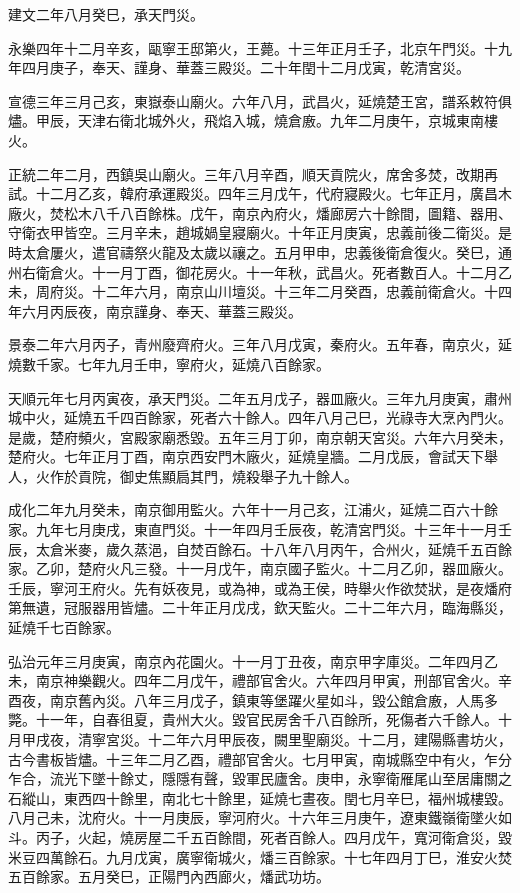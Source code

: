 \begin{pinyinscope}
建文二年八月癸巳，承天門災。

永樂四年十二月辛亥，甌寧王邸第火，王薨。十三年正月壬子，北京午門災。十九年四月庚子，奉天、謹身、華蓋三殿災。二十年閏十二月戊寅，乾清宮災。

宣德三年三月己亥，東嶽泰山廟火。六年八月，武昌火，延燒楚王宮，譜系敕符俱燼。甲辰，天津右衛北城外火，飛焰入城，燒倉廒。九年二月庚午，京城東南樓火。

正統二年二月，西鎮吳山廟火。三年八月辛酉，順天貢院火，席舍多焚，改期再試。十二月乙亥，韓府承運殿災。四年三月戊午，代府寢殿火。七年正月，廣昌木廠火，焚松木八千八百餘株。戊午，南京內府火，燔廊房六十餘間，圖籍、器用、守衛衣甲皆空。三月辛未，趙城媧皇寢廟火。十年正月庚寅，忠義前後二衛災。是時太倉屢火，遣官禱祭火龍及太歲以禳之。五月甲申，忠義後衛倉復火。癸巳，通州右衛倉火。十一月丁酉，御花房火。十一年秋，武昌火。死者數百人。十二月乙未，周府災。十二年六月，南京山川壇災。十三年二月癸酉，忠義前衛倉火。十四年六月丙辰夜，南京謹身、奉天、華蓋三殿災。

景泰二年六月丙子，青州廢齊府火。三年八月戊寅，秦府火。五年春，南京火，延燒數千家。七年九月壬申，寧府火，延燒八百餘家。

天順元年七月丙寅夜，承天門災。二年五月戊子，器皿廠火。三年九月庚寅，肅州城中火，延燒五千四百餘家，死者六十餘人。四年八月己巳，光祿寺大烹內門火。是歲，楚府頻火，宮殿家廟悉毀。五年三月丁卯，南京朝天宮災。六年六月癸未，楚府火。七年正月丁酉，南京西安門木廠火，延燒皇牆。二月戊辰，會試天下舉人，火作於貢院，御史焦顯扃其門，燒殺舉子九十餘人。

成化二年九月癸未，南京御用監火。六年十一月己亥，江浦火，延燒二百六十餘家。九年七月庚戌，東直門災。十一年四月壬辰夜，乾清宮門災。十三年十一月壬辰，太倉米麥，歲久蒸浥，自焚百餘石。十八年八月丙午，合州火，延燒千五百餘家。乙卯，楚府火凡三發。十一月戊午，南京國子監火。十二月乙卯，器皿廠火。壬辰，寧河王府火。先有妖夜見，或為神，或為王侯，時舉火作欲焚狀，是夜燔府第無遺，冠服器用皆燼。二十年正月戊戌，欽天監火。二十二年六月，臨海縣災，延燒千七百餘家。

弘治元年三月庚寅，南京內花園火。十一月丁丑夜，南京甲字庫災。二年四月乙未，南京神樂觀火。四年二月戊午，禮部官舍火。六年四月甲寅，刑部官舍火。辛酉夜，南京舊內災。八年三月戊子，鎮東等堡躍火星如斗，毀公館倉廒，人馬多斃。十一年，自春徂夏，貴州大火。毀官民房舍千八百餘所，死傷者六千餘人。十月甲戌夜，清寧宮災。十二年六月甲辰夜，闕里聖廟災。十二月，建陽縣書坊火，古今書板皆燼。十三年二月乙酉，禮部官舍火。七月甲寅，南城縣空中有火，乍分乍合，流光下墜十餘丈，隱隱有聲，毀軍民廬舍。庚申，永寧衛雁尾山至居庸關之石縱山，東西四十餘里，南北七十餘里，延燒七晝夜。閏七月辛巳，福州城樓毀。八月己未，沈府火。十一月庚辰，寧河府火。十六年三月庚午，遼東鐵嶺衛墜火如斗。丙子，火起，燒房屋二千五百餘間，死者百餘人。四月戊午，寬河衛倉災，毀米豆四萬餘石。九月戊寅，廣寧衛城火，燔三百餘家。十七年四月丁巳，淮安火焚五百餘家。五月癸巳，正陽門內西廊火，燔武功坊。


\end{pinyinscope}
